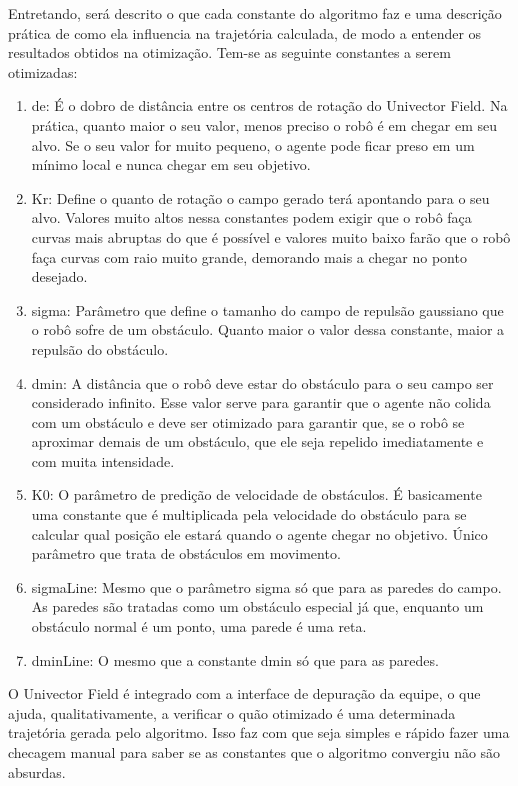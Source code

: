 \documentclass[10pt,fleqn,a4paper]{article}
\begin{document}
Entretando, será descrito o que cada constante do algoritmo faz e uma descrição prática de como ela influencia na trajetória calculada, de modo a entender os resultados obtidos na otimização. Tem-se as seguinte constantes a serem otimizadas:
\begin{enumerate}
\item de: É o dobro de distância entre os centros de rotação do Univector Field. Na prática, quanto maior o seu valor, menos preciso o robô é em chegar em seu alvo. Se o seu valor for muito pequeno, o agente pode ficar preso em um mínimo local e nunca chegar em seu objetivo.
\item Kr: Define o quanto de rotação o campo gerado terá apontando para o seu alvo. Valores muito altos nessa constantes podem exigir que o robô faça curvas mais abruptas do que é possível e valores muito baixo farão que o robô faça curvas com raio muito grande, demorando mais a chegar no ponto desejado.
\item sigma: Parâmetro que define o tamanho do campo de repulsão gaussiano que o robô sofre de um obstáculo. Quanto maior o valor dessa constante, maior a repulsão do obstáculo.
\item dmin: A distância que o robô deve estar do obstáculo para o seu campo ser considerado infinito. Esse valor serve para garantir que o agente não colida com um obstáculo e deve ser otimizado para garantir que, se o robô se aproximar demais de um obstáculo, que ele seja repelido imediatamente e com muita intensidade.
\item K0: O parâmetro de predição de velocidade de obstáculos. É basicamente uma constante que é multiplicada pela velocidade do obstáculo para se calcular qual posição ele estará quando o agente chegar no objetivo. Único parâmetro que trata de obstáculos em movimento.
\item sigmaLine: Mesmo que o parâmetro sigma só que para as paredes do campo. As paredes são tratadas como um obstáculo especial já que, enquanto um obstáculo normal é um ponto, uma parede é uma reta.
\item dminLine:  O mesmo que a constante dmin só que para as paredes.
\end{enumerate}

O Univector Field é integrado com a interface de depuração da equipe, o que ajuda, qualitativamente, a verificar o quão otimizado é uma determinada trajetória gerada pelo algoritmo. Isso faz com que seja simples e rápido fazer uma checagem manual para saber se as constantes que o algoritmo convergiu não são absurdas.
\end{document}
